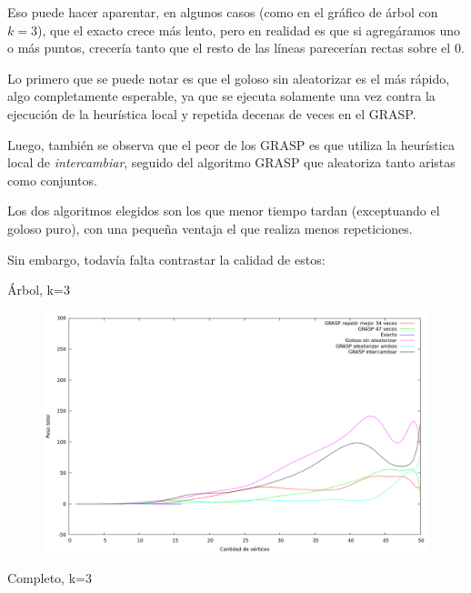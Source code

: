 Eso puede hacer aparentar, en algunos casos (como en el gráfico de árbol con
$k = 3$), que el exacto crece más lento, pero en realidad es que si agregáramos
uno o más puntos, crecería tanto que el resto de las líneas parecerían rectas
sobre el 0.

Lo primero que se puede notar es que el goloso sin aleatorizar es el más
rápido, algo completamente esperable, ya que se ejecuta solamente una vez
contra la ejecución de la heurística local y repetida decenas de veces en el
GRASP.

Luego, también se observa que el peor de los GRASP es que utiliza la heurística
local de \textit{intercambiar}, seguido del algoritmo GRASP que aleatoriza
tanto aristas como conjuntos.

Los dos algoritmos elegidos son los que menor tiempo tardan (exceptuando el
goloso puro), con una pequeña ventaja el que realiza menos repeticiones.

Sin embargo, todavía falta contrastar la calidad de estos:

Árbol, k=3

\begin{figure}[H]
  \begin{center}
    \includegraphics[scale=0.35]{imagenes/ej6-arbol-k3-peso.png}
  \end{center}
\end{figure}

Completo, k=3

